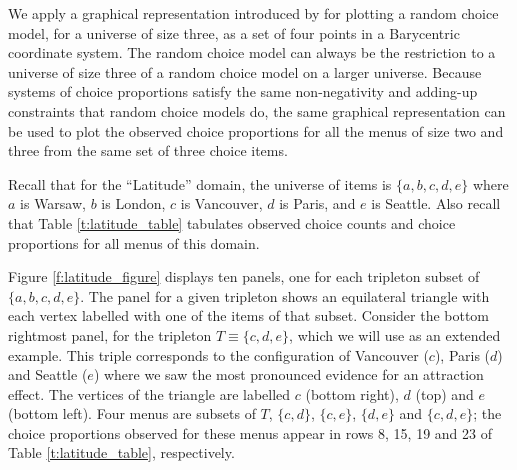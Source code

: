 \documentclass[11pt,letter]{article}
\newcommand{\menus}{menus}
\newcommand{\trip}{T}
\begin{document}
We apply a graphical representation introduced by \citet{McCaMarl13} for plotting a random choice model, for a universe of size three, as a set of four points in a Barycentric coordinate system.
The random choice model can always be the restriction to a universe of size three of a random choice model on a larger universe.
Because systems of choice proportions satisfy the same non-negativity and adding-up constraints that random choice models do, the same graphical representation can be used to plot the observed choice proportions for all the \menus{} of size two and three from the same set of three choice items.

Recall that for the ``Latitude'' domain, the universe of items is $\{a,b,c,d,e\}$ where $a$ is Warsaw, $b$ is London, $c$ is Vancouver, $d$ is Paris, and $e$ is Seattle.
Also recall that Table \ref{t:latitude_table} tabulates observed choice counts and choice proportions for all \menus{} of this domain.

Figure \ref{f:latitude_figure} displays ten panels, one for each tripleton subset of $\{a,b,c,d,e\}$.
The panel for a given tripleton shows an equilateral triangle with each vertex labelled with one of the items of that subset.
Consider the bottom rightmost panel, for the tripleton $\trip \equiv \{c,d,e\}$, which we will use as an extended example.
This triple corresponds to the configuration of Vancouver ($c$), Paris ($d$) and Seattle ($e$) where we saw the most pronounced evidence for an attraction effect.
The vertices of the triangle are labelled $c$ (bottom right), $d$ (top) and $e$ (bottom left).
Four menus are subsets of $\trip$, $\{c,d\}$, $\{c,e\}$, $\{d,e\}$ and $\{c,d,e\}$; the choice proportions observed for these menus appear in rows 8, 15, 19 and 23 of Table \ref{t:latitude_table}, respectively.
\end{document}
